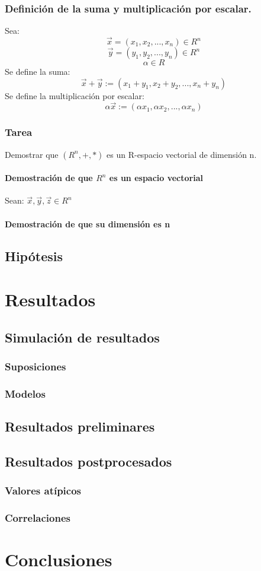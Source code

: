 \documentclass{book}
\begin{document}
\subsection{Definición de la suma y multiplicación por escalar.}
Sea:
$$\overrightarrow{x}=(x_{1},x_{2},...,x_{n})\in R^n$$
$$\overrightarrow{y}=(y_{1},y_{2},...,y_{n})\in R^n$$
$$\alpha \in R$$
Se define la suma:
$$\overrightarrow{x}+\overrightarrow{y}:=(x_{1}+y_{1},x_{2}+y_{2},...,x_{n}+y_{n})$$
Se define la multiplicación por escalar:
$$\alpha\overrightarrow{x}:=(\alpha x_{1},\alpha x_{2},...,\alpha x_{n})$$
\subsection{Tarea}
Demostrar que $(R^n,+,*)$ es un R-espacio vectorial de dimensión n.
\subsubsection{Demostración de que $R^n$ es un espacio vectorial}
Sean: $\overrightarrow{x},\overrightarrow{y},\overrightarrow{z}\in R^n$
\subsubsection{Demostración de que su dimensión es n}
\section{Hipótesis}
\chapter{Resultados}
\section{Simulación de resultados}
\subsection{Suposiciones}
\subsection{Modelos}
\section{Resultados preliminares}
\section{Resultados postprocesados}
\subsection{Valores atípicos}
\subsection{Correlaciones}
\chapter{Conclusiones}
\end{document}
